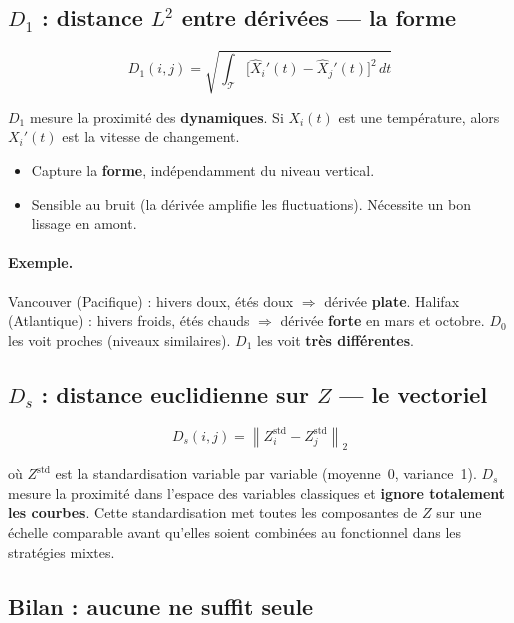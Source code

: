 \documentclass[11pt, a4paper]{article}
\begin{document}
\subsection{$D_1$ : distance $L^2$ entre dérivées — la \textbf{forme}}

\[
  D_1(i,j) = \sqrt{\int_{\mathcal{T}} \bigl[\hat{X}_i'(t) - \hat{X}_j'(t)\bigr]^2 \, dt}
\]

$D_1$ mesure la proximité des \textbf{dynamiques}. Si $X_i(t)$ est une
température, alors $X_i'(t)$ est la vitesse de changement.

\begin{itemize}[nosep]
  \item[\textcolor{mix}{$\boldsymbol{+}$}] Capture la \textbf{forme},
    indépendamment du niveau vertical.
  \item[\textcolor{vect}{$\boldsymbol{-}$}] Sensible au bruit (la dérivée
    amplifie les fluctuations). Nécessite un bon lissage en amont.
\end{itemize}

\paragraph{Exemple.}
Vancouver (Pacifique) : hivers doux, étés doux $\Rightarrow$ dérivée
\textbf{plate}. Halifax (Atlantique) : hivers froids, étés chauds
$\Rightarrow$ dérivée \textbf{forte} en mars et octobre. $D_0$ les voit
proches (niveaux similaires). $D_1$ les voit \textbf{très différentes}.

\subsection{$D_s$ : distance euclidienne sur $Z$ — le \textbf{vectoriel}}

\[
  D_s(i,j) = \left\| Z_i^{\text{std}} - Z_j^{\text{std}} \right\|_2
\]

où $Z^{\text{std}}$ est la standardisation variable par variable
(moyenne~0, variance~1). $D_s$ mesure la proximité dans l'espace des
variables classiques et \textbf{ignore totalement les courbes}. Cette
standardisation met toutes les composantes de $Z$ sur une échelle
comparable avant qu'elles soient combinées au fonctionnel dans les
stratégies mixtes.

\subsection{Bilan : aucune ne suffit seule}
\end{document}
